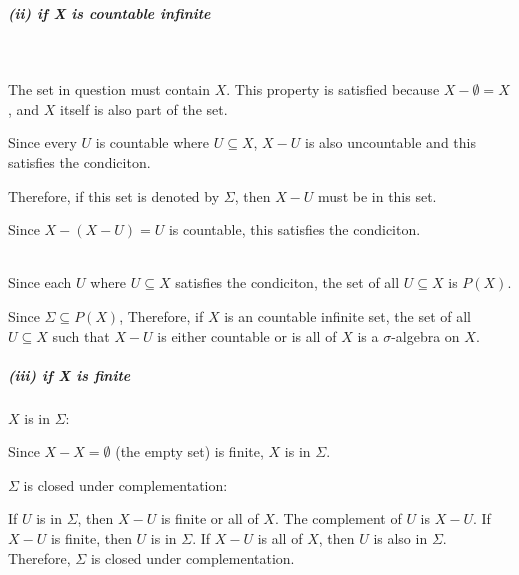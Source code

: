 \documentclass[12pt]{article}
\begin{document}
\subparagraph{(ii) if X is countable infinite}
\ \\
\par \hspace*{1em}The set in question must contain \(X\). This property is satisfied because \( X - \emptyset = X \), and \( X \) itself is also part of the set. \\
\par \hspace*{1em}Since every \(U\) is countable where \( U \subseteq X \), \(X-U\) is also uncountable and this satisfies the condiciton. \\
\par \hspace*{1em}Therefore, if this set is denoted by \( \Sigma \), then \( X-U \) must be in this set. \\
\par \hspace*{1em}Since \( X - (X-U) = U\) is countable, this satisfies the condiciton. \\ \\

\par \hspace*{1em}Since each \( U \) where \( U \subseteq X \) satisfies the condiciton, the set of all \( U \subseteq X \) is \( P(X) \). \\
\par \hspace*{1em}Since \( \Sigma \subseteq P(X) \), Therefore, if \( X \) is an countable infinite set, the set of all \( U \subseteq X \) such that \( X - U \) is either countable or is all of \(X\) is a \( \sigma \)-algebra on \( X \).
\subparagraph{(iii) if X is finite}

\par \hspace*{1em}$X$ is in $\Sigma$:

\par \hspace*{1em}Since $X - X = \emptyset$ (the empty set) is finite, $X$ is in $\Sigma$.

\par \hspace*{1em}$\Sigma$ is closed under complementation:

\par \hspace*{1em}If $U$ is in $\Sigma$, then $X - U$ is finite or all of $X$. The complement of $U$ is $X - U$. If $X - U$ is finite, then $U$ is in $\Sigma$. If $X - U$ is all of $X$, then $U$ is also in $\Sigma$. Therefore, $\Sigma$ is closed under complementation.
\end{document}
